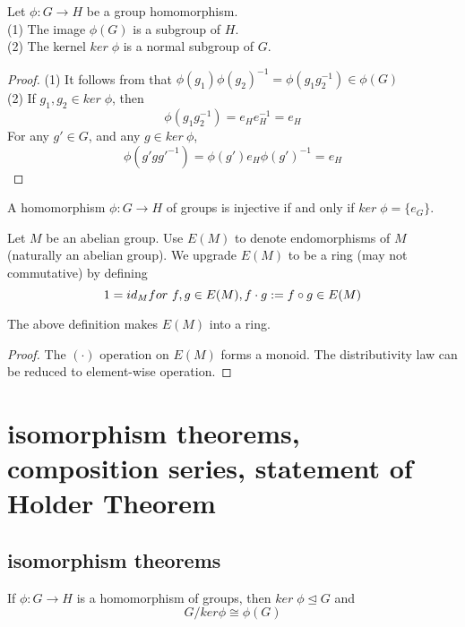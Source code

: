 \documentclass[11pt,fleqn]{book} %
\begin{document}
\begin{CJK}{UTF8}{gkai}
\begin{lemma}
	Let $\phi:G\to H$ be a group homomorphism. \\
	(1) The image $\phi(G)$ is a subgroup of $H$. \\
	(2) The kernel $ker \; \phi$ is a normal subgroup of $G$.
\end{lemma}
\begin{proof}
	(1) It follows from that $\phi(g_1)\phi(g_2)^{-1} = \phi(g_1g_2^{-1}) \in \phi(G)$ \\
	(2) If $g_1, g_2 \in ker \; \phi$, then 
	\[\phi(g_1g_2^{-1}) = e_He_H^{-1} = e_H\]
	For any $g' \in G$, and any $g \in ker \ \phi$, \[\phi(g'gg'^{-1}) = \phi(g')e_H\phi(g')^{-1} = e_H\]  
\end{proof}

\begin{lemma}
	A homomorphism $\phi: G \to H$ of groups is injective if and only if $ker \; \phi = \{e_G\}$.
\end{lemma}

\begin{definition}
	 Let $M$ be an abelian group. Use $E(M)$ to denote endomorphisms of $M$ (naturally an abelian group). We upgrade $E(M)$ to be a ring (may not commutative) by defining 
	\[
		1 = id_M \\
		for \ f,g \in E(M), f\cdot g := f\circ g \in E(M)\]
\end{definition}
\begin{proposition}
	The above definition makes $E(M)$ into a ring.	
\end{proposition}
\begin{proof}
	The $(\cdot)$ operation on $E(M)$ forms a monoid. The distributivity law can be reduced to element-wise operation.
\end{proof}

\section{isomorphism theorems, composition series, statement of Holder Theorem}
\subsection{isomorphism theorems}

\begin{theorem}
	 If $\phi: G \to H$ is a homomorphism of groups, then $ker \; \phi \unlhd G$ and \[
		G / ker \phi \cong \phi(G) \]
\end{theorem}


\end{CJK}
\end{document}

